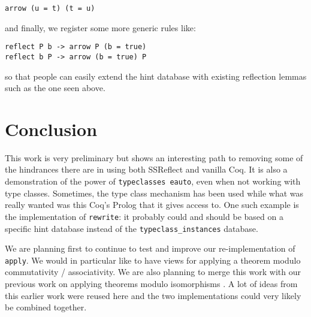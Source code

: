 \documentclass[nocopyrightspace,blockstyle,numbers]{sigplanconf}
\begin{document}
\begin{verbatim}
arrow (u = t) (t = u)
\end{verbatim}
and finally, we register some more generic rules like:

\begin{verbatim}
reflect P b -> arrow P (b = true)
reflect b P -> arrow (b = true) P
\end{verbatim}
so that people can easily extend the hint database with
existing reflection lemmas such as the one seen above.

\section{Conclusion}

This work is very preliminary but shows an interesting path
to removing some of the hindrances there are in using
both SSReflect and vanilla Coq.
It is also a demonstration of the power of
\texttt{typeclasses eauto}, even when not working with
type classes.
Sometimes, the type class mechanism has been used while what
was really wanted was this Coq's Prolog that it gives access to.
One such example is the implementation of \texttt{rewrite}:
it probably could and should be based on a specific hint
database instead of the \texttt{typeclass\_instances} database.

We are planning first to continue to test and improve our
re-implementation of \texttt{apply}. We would in particular like
to have views for applying a theorem modulo commutativity /
associativity. We are also planning to merge this work with our
previous work on applying theorems modulo isomorphisms
\cite{zimmermann}. A lot of ideas from this earlier work were
reused here and the two implementations could very likely be
combined together.












\end{document}
